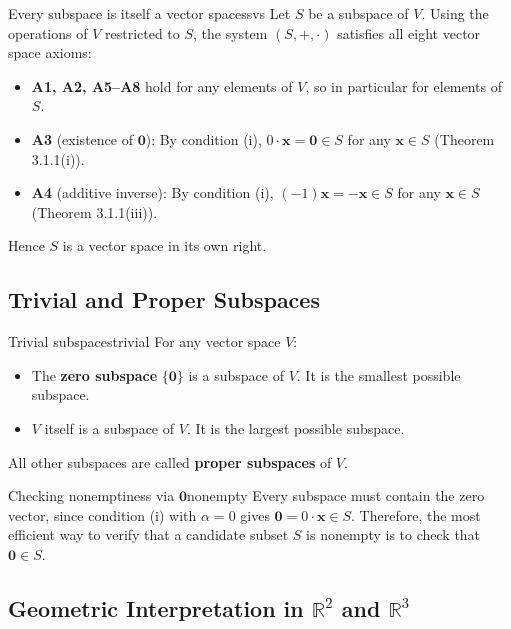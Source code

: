 \documentclass[12pt,a4paper]{article}
\newcommand{\R}{\mathbb{R}}
\newcommand{\vv}[1]{\mathbf{#1}}
\newcommand{\vzero}{\mathbf{0}}
\begin{document}
\begin{remark}{Every subspace is itself a vector space}{ssvs}
  Let $S$ be a subspace of $V$.  Using the operations of $V$ restricted to $S$,
  the system $(S, +, \cdot)$ satisfies all eight vector space axioms:
  \begin{itemize}[leftmargin=2em]
    \item \textbf{A1, A2, A5--A8} hold for any elements of $V$, so in particular
          for elements of $S$.
    \item \textbf{A3} (existence of $\vzero$): By condition (i),
          $0 \cdot \vv{x} = \vzero \in S$ for any $\vv{x} \in S$
          (Theorem 3.1.1(i)).
    \item \textbf{A4} (additive inverse): By condition (i),
          $(-1)\vv{x} = -\vv{x} \in S$ for any $\vv{x} \in S$
          (Theorem 3.1.1(iii)).
  \end{itemize}
  Hence $S$ is a vector space in its own right.
\end{remark}

\subsection{Trivial and Proper Subspaces}

\begin{remark}{Trivial subspaces}{trivial}
  For any vector space $V$:
  \begin{itemize}[leftmargin=2em]
    \item The \textbf{zero subspace} $\{\vzero\}$ is a subspace of $V$.
          It is the smallest possible subspace.
    \item $V$ itself is a subspace of $V$.
          It is the largest possible subspace.
  \end{itemize}
  All other subspaces are called \textbf{proper subspaces} of $V$.
\end{remark}

\begin{remark}{Checking nonemptiness via $\vzero$}{nonempty}
  Every subspace must contain the zero vector, since condition (i) with
  $\alpha = 0$ gives $\vzero = 0\cdot\vv{x} \in S$.  Therefore, the most
  efficient way to verify that a candidate subset $S$ is nonempty is to
  check that $\vzero \in S$.
\end{remark}

\subsection{Geometric Interpretation in \texorpdfstring{$\R^2$}{R2} and
\texorpdfstring{$\R^3$}{R3}}
\end{document}
